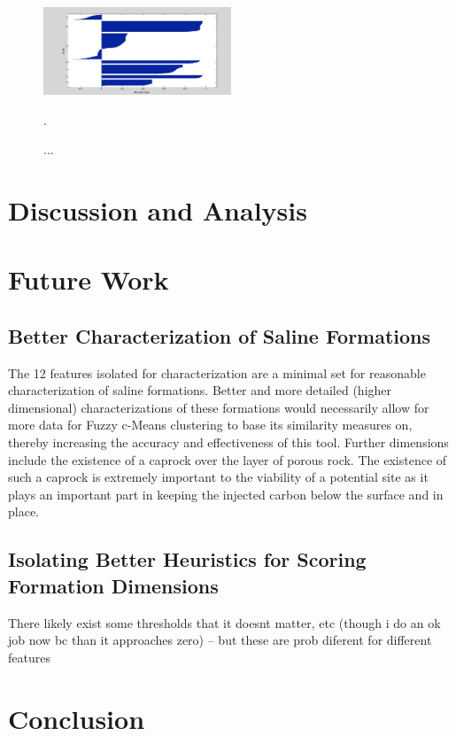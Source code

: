 \documentclass[a4paper, 12pt]{article}
\begin{document}
\begin{figure}%
   \centering
  \includegraphics[width=0.5\textwidth]{k_means_sil}
   \caption{\label{k_means_sil} ... }. 
\end{figure}


\section{Discussion and Analysis}

\section{Future Work}
\subsection{Better Characterization of Saline Formations}\cite{betterchar}
The 12 features isolated for characterization are a minimal set for reasonable characterization of saline formations. Better and more detailed (higher dimensional) characterizations of these formations would necessarily allow for more data for Fuzzy c-Means clustering to base its similarity measures on, thereby increasing the accuracy and effectiveness of this tool. Further dimensions include the existence of a caprock over the layer of porous rock. The existence of such a caprock is extremely important to the viability of a potential site as it plays an important part in keeping the injected carbon below the surface and in place.  

\subsection{Isolating Better Heuristics for Scoring Formation Dimensions}
There likely exist some thresholds that it doesnt matter, etc (though i do an ok job now bc than it approaches zero) -- but these are prob diferent for different features
\section{Conclusion}
\end{document}

